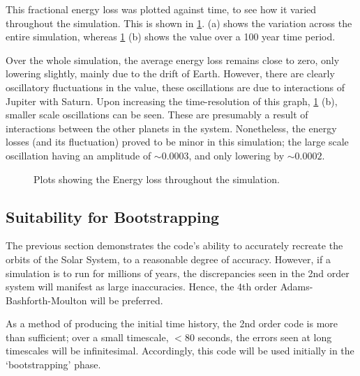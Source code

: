 \documentclass[a4paper,10pt]{article}
\begin{document}
This fractional energy loss was plotted against time, to see how it varied throughout the simulation. This is shown in \cref{Energy}.  (a) shows the variation across the entire simulation, whereas \cref{Energy} (b) shows the value over a 100 year time period. 

Over the whole simulation, the average energy loss remains close to zero, only lowering slightly, mainly due to the drift of Earth. However, there are clearly oscillatory fluctuations in the value, these oscillations are due to interactions of Jupiter with Saturn. Upon increasing the time-resolution of this graph, \cref{Energy} (b), smaller scale oscillations can be seen. These are presumably a result of interactions between the other planets in the system. Nonetheless, the energy losses (and its fluctuation) proved to be minor in this simulation; the large scale oscillation having an amplitude of $\sim 0.0003$, and only lowering by $\sim 0.0002$.

\begin{figure}[h!]
    \centering
    \qquad
    \caption{Plots showing the Energy loss throughout the simulation.}%
    \label{Energy}%
\end{figure}

\subsection{Suitability for Bootstrapping}\label{Suitable}

The previous section demonstrates the code's ability to accurately recreate the orbits of the Solar System, to a reasonable degree of accuracy. However, if a simulation is to run for millions of years, the discrepancies seen in the 2nd order system will manifest as large inaccuracies. Hence, the 4th order Adams-Bashforth-Moulton will be preferred.

As a method of producing the initial time history, the 2nd order code is more than sufficient; over a small timescale, $<80$ seconds, the errors seen at long timescales will be infinitesimal. Accordingly, this code will be used initially in the `bootstrapping' phase.   
\end{document}
